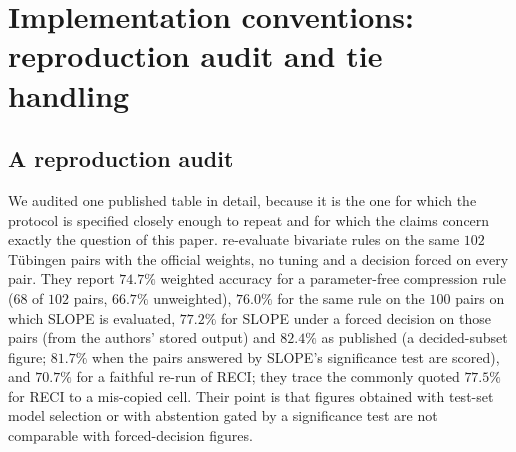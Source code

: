 \section{Implementation conventions: reproduction audit and tie handling}\label{sec:conventions}

\subsection{A reproduction audit}\label{sec:audit}

We audited one published table in detail, because it is the one for which the protocol is specified closely enough to repeat and for which the claims concern exactly the question of this paper. \citet{stienstra2026oneruler} re-evaluate bivariate rules on the same $102$ T\"ubingen pairs with the official weights, no tuning and a decision forced on every pair. They report $74.7\%$ weighted accuracy for a parameter-free compression rule ($68$ of $102$ pairs, $66.7\%$ unweighted), $76.0\%$ for the same rule on the $100$ pairs on which SLOPE \citep{marx2017slope} is evaluated, $77.2\%$ for SLOPE under a forced decision on those pairs (from the authors' stored output) and $82.4\%$ as published (a decided-subset figure; $81.7\%$ when the pairs answered by SLOPE's significance test are scored), and $70.7\%$ for a faithful re-run of RECI; they trace the commonly quoted $77.5\%$ for RECI to a mis-copied cell. Their point is that figures obtained with test-set model selection or with abstention gated by a significance test are not comparable with forced-decision figures.

